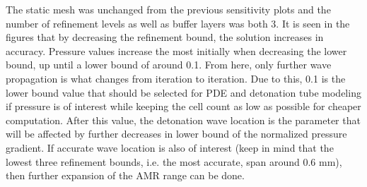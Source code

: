 \noindent The static mesh was unchanged from the previous sensitivity plots and the number of refinement levels as well as buffer layers was both 3. It is seen in the figures that by decreasing the refinement bound, the solution increases in accuracy. Pressure values increase the most initially when decreasing the lower bound, up until a lower bound of around 0.1. From here, only further wave propagation is what changes from iteration to iteration. Due to this, 0.1 is the lower bound value that should be selected for PDE and detonation tube modeling if pressure is of interest while keeping the cell count as low as possible for cheaper computation. After this value, the detonation wave location is the parameter that will be affected by further decreases in lower bound of the normalized pressure gradient. If accurate wave location is also of interest (keep in mind that the lowest three refinement bounds, i.e. the most accurate, span around 0.6 mm), then further expansion of the AMR range can be done. 



